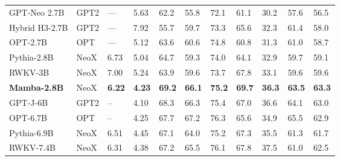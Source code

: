\begin{tabular}{lllllllllll}
\hline
GPT-Neo 2.7B & GPT2 & — & 5.63 & 62.2 & 55.8 & 72.1 & 61.1 & 30.2 & 57.6 & 56.5 \\
Hybrid H3-2.7B & GPT2 & — & 7.92 & 55.7 & 59.7 & 73.3 & 65.6 & 32.3 & 61.4 & 58.0 \\
OPT-2.7B & OPT & — & 5.12 & 63.6 & 60.6 & 74.8 & 60.8 & 31.3 & 61.0 & 58.7 \\
Pythia-2.8B & NeoX & 6.73 & 5.04 & 64.7 & 59.3 & 74.0 & 64.1 & 32.9 & 59.7 & 59.1 \\
RWKV-3B & NeoX & 7.00 & 5.24 & 63.9 & 59.6 & 73.7 & 67.8 & 33.1 & 59.6 & 59.6 \\
\textbf{Mamba-2.8B} & NeoX & \textbf{6.22} & \textbf{4.23} & \textbf{69.2} & \textbf{66.1} & \textbf{75.2} & \textbf{69.7} & \textbf{36.3} & \textbf{63.5} & \textbf{63.3} \\
\hline
GPT-J-6B & GPT2 & – & 4.10 & 68.3 & 66.3 & 75.4 & 67.0 & 36.6 & 64.1 & 63.0 \\
OPT-6.7B & OPT & – & 4.25 & 67.7 & 67.2 & 76.3 & 65.6 & 34.9 & 65.5 & 62.9 \\
Pythia-6.9B & NeoX & 6.51 & 4.45 & 67.1 & 64.0 & 75.2 & 67.3 & 35.5 & 61.3 & 61.7 \\
RWKV-7.4B & NeoX & 6.31 & 4.38 & 67.2 & 65.5 & 76.1 & 67.8 & 37.5 & 61.0 & 62.5 \\
\hline
\end{tabular}
